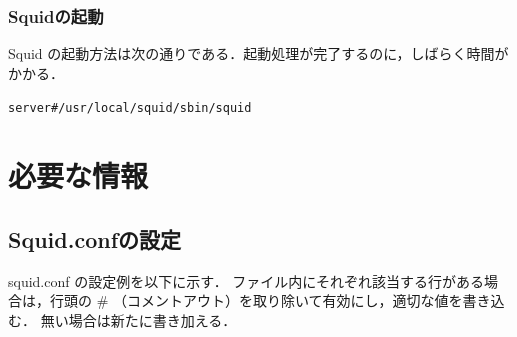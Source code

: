 \subsubsection{Squidの起動}
Squid の起動方法は次の通りである．起動処理が完了するのに，しばらく時間がかかる．

\begin{center}
\begin{breakbox}
\begin{alltt}
server# /usr/local/squid/sbin/squid
\end{alltt}
\end{breakbox}
\end{center}

%

\section{必要な情報}
\subsection{Squid.confの設定}
squid.conf の設定例を以下に示す．
ファイル内にそれぞれ該当する行がある場合は，行頭の \# （コメントアウト）を取り除いて有効にし，適切な値を書き込む．
無い場合は新たに書き加える．


